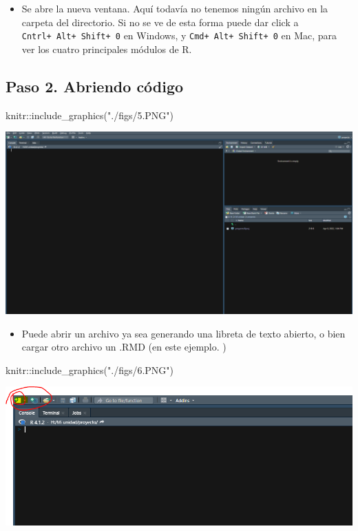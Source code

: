 \documentclass[
]{article}
\newenvironment{Shaded}{}{}
\newcommand{\FunctionTok}[1]{\textcolor[rgb]{0.02,0.16,0.49}{#1}}
\newcommand{\NormalTok}[1]{#1}
\newcommand{\SpecialCharTok}[1]{\textcolor[rgb]{0.25,0.44,0.63}{#1}}
\newcommand{\StringTok}[1]{\textcolor[rgb]{0.25,0.44,0.63}{#1}}
\providecommand{\tightlist}{%
  \setlength{\itemsep}{0pt}\setlength{\parskip}{0pt}}
\begin{document}
\begin{itemize}
\tightlist
\item
  Se abre la nueva ventana. Aquí todavía no tenemos ningún archivo en la
  carpeta del directorio. Si no se ve de esta forma puede dar click a
  \texttt{Cntrl+\ Alt+\ Shift+\ 0} en Windows, y
  \texttt{Cmd+\ Alt+\ Shift+\ 0} en Mac, para ver los cuatro principales
  módulos de R.
\end{itemize}

\hypertarget{paso-2.-abriendo-cuxf3digo}{%
\subsection{Paso 2. Abriendo código}\label{paso-2.-abriendo-cuxf3digo}}

\begin{Shaded}
\begin{Highlighting}[]
\NormalTok{knitr}\SpecialCharTok{::}\FunctionTok{include\_graphics}\NormalTok{(}\StringTok{"./figs/5.PNG"}\NormalTok{)}
\end{Highlighting}
\end{Shaded}

\begin{center}\includegraphics[width=0.6\linewidth]{./figs/5} \end{center}

\begin{itemize}
\tightlist
\item
  Puede abrir un archivo ya sea generando una libreta de texto abierto,
  o bien cargar otro archivo un .RMD (en este ejemplo. )
\end{itemize}

\begin{Shaded}
\begin{Highlighting}[]
\NormalTok{knitr}\SpecialCharTok{::}\FunctionTok{include\_graphics}\NormalTok{(}\StringTok{"./figs/6.PNG"}\NormalTok{)}
\end{Highlighting}
\end{Shaded}

\begin{center}\includegraphics[width=0.6\linewidth]{./figs/6} \end{center}
\end{document}
